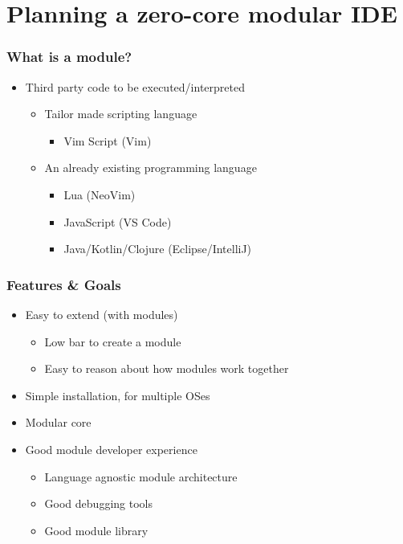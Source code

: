 \section{Planning a zero-core modular IDE}
\SectionPage

\begin{frame}
  \frametitle{What is a module?}
  \begin{itemize}
    \item Third party code to be executed/interpreted
      \pause
      \begin{itemize}
        \item Tailor made scripting language
          \pause
          \begin{itemize}
            \item Vim Script (Vim)
              \pause
          \end{itemize}
        \item An already existing programming language
          \pause
          \begin{itemize}
            \item Lua (NeoVim)
              \pause
            \item JavaScript (VS Code)
              \pause
            \item Java/Kotlin/Clojure (Eclipse/IntelliJ)
          \end{itemize}
      \end{itemize}
  \end{itemize}
\end{frame}

\begin{frame}
  \frametitle{Features \& Goals}
  \begin{itemize}
    \item Easy to extend (with modules)
      \pause
      \begin{itemize}
        \item Low bar to create a module
          \pause
        \item Easy to reason about how modules work together
      \end{itemize}
    \item Simple installation, for multiple OSes
      \pause
    \item Modular core
      \pause
    \item Good module developer experience
      \begin{itemize}
          \pause
        \item Language agnostic module architecture
          \pause
        \item Good debugging tools
          \pause
        \item Good module library
      \end{itemize}
  \end{itemize}
\end{frame}